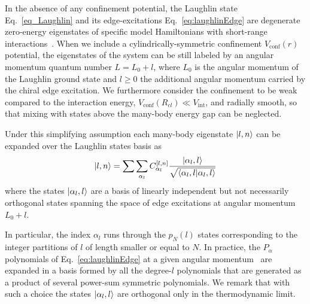 \documentclass[twocolumn,pra,superscriptaddress,noshowpacs]{revtex4}
\begin{document}
In the absence of any confinement potential, the Laughlin state Eq.~\eqref{eq_Laughlin} and its edge-excitations Eq.~\eqref{eq:laughlinEdge} are degenerate zero-energy eigenstates of specific model Hamiltonians with short-range interactions~\cite{Haldane_PRL_1983, TrugmanKivelson_PRB_1985, SimonRezayiCooper_PRB_2007_1,SimonRezayiCooper_PRB_2007_2}.%
When we include a cylindrically-symmetric confinement $V_\text{conf}(r)$ potential, the eigenstates of the system can be still labeled by an angular momentum quantum number $L=L_0+l$, where $L_0$ is the angular momentum of the Laughlin ground state and $l\geq0$ the additional angular momentum carried by the chiral edge excitation.
We furthermore consider the confinement to be weak compared to the interaction energy, $V_\text{conf}(R_{cl})\ll V_\text{int}$, and radially smooth, so that mixing with states above the many-body energy gap can be neglected. 

Under this simplifying assumption each many-body eigenstate $\ket{l,n}$ can be expanded over the Laughlin states basis as
\begin{equation}
    \ket{l,n}=\sum \sum_{\alpha_l} C_{\alpha_l}^{[l,n]} \frac{\ket{\alpha_l,l}}{\sqrt{\braket{\alpha_l,l|\alpha_l,l}}}
    \label{eq:app_eigenstate_expansion}
\end{equation}
where the states $\ket{\alpha_l,l}$ are a basis of linearly independent but not necessarily orthogonal states spanning the space of edge excitations at angular momentum $L_0+l$.

In particular, the index $\alpha_l$ runs through the $p_N(l)$ states corresponding to the integer partitions of $l$ of length smaller or equal to $N$.
In practice, the $P_\alpha$ polynomials of Eq.~\eqref{eq:laughlinEdge} at a given angular momentum~\cite{SimonWavefunctionology_2020} are expanded in a basis formed by all the degree-$l$ polynomials that are generated as a product of several power-sum symmetric polynomials.
We remark that with such a choice the states $\ket{\alpha_l,l}$ are orthogonal only in the thermodynamic limit.
    
\end{document}
